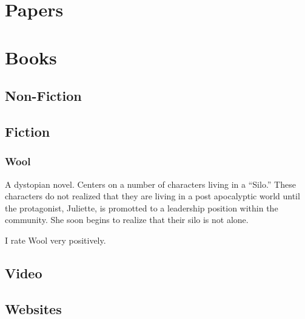 \documentclass[12pt]{article}
\newenvironment{annotatedcitation}[2]%
{\bigskip \subsubsection*{#1} \noindent \fullcite{#2} \bigskip}%
{\bigskip}
\begin{document}
\section{Papers}

\section{Books}

\subsection{Non-Fiction}

\subsection{Fiction}

\begin{annotatedcitation}{Wool}{howey12}
A dystopian novel. Centers on a number of characters living in a
``Silo.'' These characters do not realized that they are living in a
post apocalyptic world until the protagonist, Juliette, is promotted
to a leadership position within the community. She soon begins to
realize that their silo is not alone.

I rate Wool very positively.
\end{annotatedcitation}

\subsection{Video}

\subsection{Websites}
\end{document}
